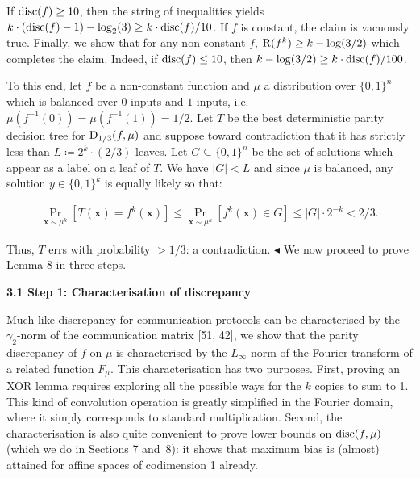 \documentclass[10pt,a4paper]{article}
\begin{document}
If ${\textup{disc}}(f)\geq 10$, then the string of inequalities yields $k\cdot({\textup{disc}}(f)-1)-\log_{2}(3)\geq k\cdot{\textup{disc}}(f)/10$. If $f$ is constant, the claim is vacuously true. Finally, we show that for any non-constant $f$, ${\textup{R}}(f^{k})\geq k-\log(3/2)$ which completes the claim. Indeed, if ${\textup{disc}}(f)\leq 10$, then $k-\log(3/2)\geq k\cdot{\textup{disc}}(f)/100$.\par




To this end, let $f$ be a non-constant function and $\mu$ a distribution over $\{0,1\}^{n}$ which is balanced over $0$-inputs and $1$-inputs, i.e. $\mu(f^{-1}(0))=\mu(f^{-1}(1))=1/2$. Let $T$ be the best deterministic parity decision tree for ${\textup{D}}_{1/3}(f,\mu)$ and suppose toward contradiction that it has strictly less than $L\coloneqq 2^{k}\cdot(2/3)$ leaves. Let $G\subseteq\{0,1\}^{n}$ be the set of solutions which appear as a label on a leaf of $T$. We have $|G|<L$ and since $\mu$ is balanced, any solution $y\in\{0,1\}^{k}$ is equally likely so that:\par


\[\begin{gathered}
\Pr_{\bm{x}\sim\mu^{k}}[T(\bm{x})=f^{k}(\bm{x})]\leq\Pr_{\bm{x}\sim\mu^{k}}[f^{k}(\bm{x})\in G]\leq|G|\cdot 2^{-k}<2/3.
\end{gathered}\]


Thus, $T$ errs with probability $>1/3$: a contradiction.
$\blacktriangleleft$
We now proceed to prove Lemma 8 in three steps.\par





\par\medskip\noindent\textbf{
3.1 Step 1: Characterisation of discrepancy}\par




Much like discrepancy for communication protocols can be characterised by the $\gamma_{2}$-norm of the communication matrix [51, 42], we show that the parity discrepancy of $f$ on $\mu$ is characterised by the $L_{\infty}$-norm of the Fourier transform of a related function $F_{\mu}$. This characterisation has two purposes. First, proving an XOR lemma requires exploring all the possible ways for the $k$ copies to sum to 1. This kind of convolution operation is greatly simplified in the Fourier domain, where it simply corresponds to standard multiplication. Second, the characterisation is also quite convenient to prove lower bounds on ${\textup{disc}}(f,\mu)$ (which we do in Sections 7 and 8): it shows that maximum bias is (almost) attained for affine spaces of codimension 1 already.\par
\end{document}
